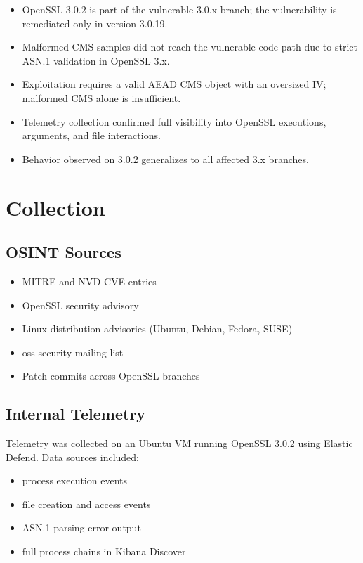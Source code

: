 \documentclass[12pt]{article}
\begin{document}
\begin{itemize}
    \item OpenSSL 3.0.2 is part of the vulnerable 3.0.x branch; the 
    vulnerability is remediated only in version 3.0.19.
    \item Malformed CMS samples did not reach the vulnerable code path 
    due to strict ASN.1 validation in OpenSSL 3.x.
    \item Exploitation requires a valid AEAD CMS object with an 
    oversized IV; malformed CMS alone is insufficient.
    \item Telemetry collection confirmed full visibility into OpenSSL 
    executions, arguments, and file interactions.
    \item Behavior observed on 3.0.2 generalizes to all affected 3.x 
    branches.
\end{itemize}

\section{Collection}

\subsection*{OSINT Sources}
\begin{itemize}
    \item MITRE and NVD CVE entries
    \item OpenSSL security advisory
    \item Linux distribution advisories (Ubuntu, Debian, Fedora, SUSE)
    \item oss-security mailing list
    \item Patch commits across OpenSSL branches
\end{itemize}

\subsection*{Internal Telemetry}
Telemetry was collected on an Ubuntu VM running OpenSSL 3.0.2 using 
Elastic Defend. Data sources included:
\begin{itemize}
    \item process execution events
    \item file creation and access events
    \item ASN.1 parsing error output
    \item full process chains in Kibana Discover
\end{itemize}
\end{document}
